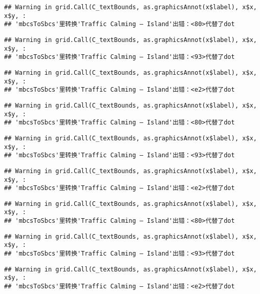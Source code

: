 \documentclass[
]{article}
\begin{document}
\begin{verbatim}
## Warning in grid.Call(C_textBounds, as.graphicsAnnot(x$label), x$x, x$y, :
## 'mbcsToSbcs'里转换'Traffic Calming – Island'出错：<80>代替了dot
\end{verbatim}

\begin{verbatim}
## Warning in grid.Call(C_textBounds, as.graphicsAnnot(x$label), x$x, x$y, :
## 'mbcsToSbcs'里转换'Traffic Calming – Island'出错：<93>代替了dot
\end{verbatim}

\begin{verbatim}
## Warning in grid.Call(C_textBounds, as.graphicsAnnot(x$label), x$x, x$y, :
## 'mbcsToSbcs'里转换'Traffic Calming – Island'出错：<e2>代替了dot
\end{verbatim}

\begin{verbatim}
## Warning in grid.Call(C_textBounds, as.graphicsAnnot(x$label), x$x, x$y, :
## 'mbcsToSbcs'里转换'Traffic Calming – Island'出错：<80>代替了dot
\end{verbatim}

\begin{verbatim}
## Warning in grid.Call(C_textBounds, as.graphicsAnnot(x$label), x$x, x$y, :
## 'mbcsToSbcs'里转换'Traffic Calming – Island'出错：<93>代替了dot
\end{verbatim}

\begin{verbatim}
## Warning in grid.Call(C_textBounds, as.graphicsAnnot(x$label), x$x, x$y, :
## 'mbcsToSbcs'里转换'Traffic Calming – Island'出错：<e2>代替了dot
\end{verbatim}

\begin{verbatim}
## Warning in grid.Call(C_textBounds, as.graphicsAnnot(x$label), x$x, x$y, :
## 'mbcsToSbcs'里转换'Traffic Calming – Island'出错：<80>代替了dot
\end{verbatim}

\begin{verbatim}
## Warning in grid.Call(C_textBounds, as.graphicsAnnot(x$label), x$x, x$y, :
## 'mbcsToSbcs'里转换'Traffic Calming – Island'出错：<93>代替了dot
\end{verbatim}

\begin{verbatim}
## Warning in grid.Call(C_textBounds, as.graphicsAnnot(x$label), x$x, x$y, :
## 'mbcsToSbcs'里转换'Traffic Calming – Island'出错：<e2>代替了dot
\end{verbatim}
\end{document}
